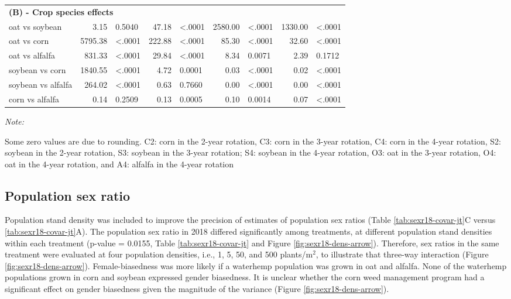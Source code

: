 \documentclass[
]{article}
\begin{document}
\begin{table}
\begin{threeparttable}
\begin{tabular}[t]{lrlr>{}l|rlrl}
\multicolumn{9}{l}{\textbf{(B) - Crop species effects}}\\
\hspace{1em}oat vs soybean & 3.15 & 0.5040 & 47.18 & <.0001 & 2580.00 & <.0001 & 1330.00 & <.0001\\
\hspace{1em}oat vs corn & 5795.38 & <.0001 & 222.88 & <.0001 & 85.30 & <.0001 & 32.60 & <.0001\\
\hspace{1em}oat vs alfalfa & 831.33 & <.0001 & 29.84 & <.0001 & 8.34 & 0.0071 & 2.39 & 0.1712\\
\hspace{1em}soybean vs corn & 1840.55 & <.0001 & 4.72 & 0.0001 & 0.03 & <.0001 & 0.02 & <.0001\\
\hspace{1em}soybean vs alfalfa & 264.02 & <.0001 & 0.63 & 0.7660 & 0.00 & <.0001 & 0.00 & <.0001\\
\hspace{1em}corn vs alfalfa & 0.14 & 0.2509 & 0.13 & 0.0005 & 0.10 & 0.0014 & 0.07 & <.0001\\
\bottomrule
\end{tabular}
\begin{tablenotes}[para]
\item \textit{Note: } 
\item Some zero values are due to rounding. C2: corn in the 2-year rotation, C3: corn in the 3-year rotation, C4: corn in the 4-year rotation, S2: soybean in the 2-year rotation, S3: soybean in the 3-year rotation; S4: soybean in the 4-year rotation, O3: oat in the 3-year rotation, O4: oat in the 4-year rotation, and A4: alfalfa in the 4-year rotation
\end{tablenotes}
\end{threeparttable}
\end{table}

\hypertarget{population-sex-ratio}{%
\subsection*{Population sex ratio}\label{population-sex-ratio}}

Population stand density was included to improve the precision of estimates of population sex ratios (Table \ref{tab:sexr18-covar-jt}C versus \ref{tab:sexr18-covar-jt}A). The population sex ratio in 2018 differed significantly among treatments, at different population stand densities within each treatment (p-value = 0.0155, Table \ref{tab:sexr18-covar-jt} and Figure \ref{fig:sexr18-dens-arrow}). Therefore, sex ratios in the same treatment were evaluated at four population densities, i.e., 1, 5, 50, and 500 plants/m\(^2\), to illustrate that three-way interaction (Figure \ref{fig:sexr18-dens-arrow}). Female-biasedness was more likely if a waterhemp population was grown in oat and alfalfa. None of the waterhemp populations grown in corn and soybean expressed gender biasedness. It is unclear whether the corn weed management program had a significant effect on gender biasedness given the magnitude of the variance (Figure \ref{fig:sexr18-dens-arrow}).
\end{document}

